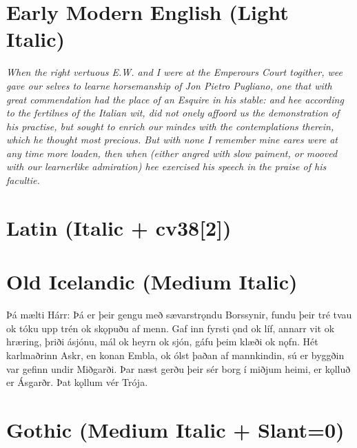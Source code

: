 \documentclass[12pt,letterpaper,openany]{book}
\begin{document}
\section{Early Modern English (Light Italic)}

\textit{\large\itallight{}When the right vertuous E.W. and I were at the Emperours Court to\-gither, wee gave our selves to learne horsemanship of Jon Pietro Pugliano, one that with great commendation had the place of an Esquire in his stable: and hee according to the fertilnes of the Italian wit, did not onely affoord us the demonstration of his practise, but sought to enrich our \mbox{mindes} with the contemplations therein, which he thought most precious. But with none I remember mine eares were at any time more loaden, then when (either angred with slow paiment, or mooved with our learnerlike admiration) hee exercised his speech in the praise of his facultie.}

\section{Latin (Italic + cv38[2])}

\textit{\large{}}

\section{Old Icelandic (Medium Italic)}

{\italmedium\large Þá mælti Hárr: Þá er þeir gengu með sævarstrǫndu Borssynir, fundu þeir tré tvau ok tóku upp trén ok skǫpuðu af menn. Gaf inn fyrsti ǫnd ok líf, annarr vit ok hræring, þriði ásjónu, mál ok heyrn ok sjón, gáfu þeim klæði ok nǫfn. Hét karlmaðrinn Askr, en konan Embla, ok ólst þaðan af mannkindin, sú er byggðin var gefinn undir Miðgarði. Þar næst gerðu þeir sér borg í miðjum heimi, er kǫlluð er Ásgarðr. Þat kǫllum vér Trója.}

\section{Gothic (Medium Italic + Slant=0)}
\end{document}
